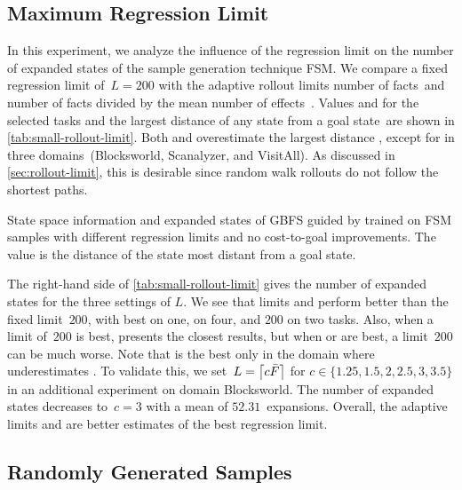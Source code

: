 \subsection{Maximum Regression Limit}
\label{sec:small-exps-rollout-limit}

In this experiment, we analyze the influence of the regression limit on the number of expanded states of the sample generation technique FSM. We compare a fixed regression limit of~$L=200$ with the adaptive rollout limits number of facts~\facts and number of facts divided by the mean number of effects~\meanfx. Values \facts and \meanfx for the selected tasks and the largest distance of any state from a goal state~\ssdiameter are shown in \cref{tab:small-rollout-limit}. Both \facts and \meanfx overestimate the largest distance \ssdiameter, except for \meanfx in three domains~(Blocksworld, Scanalyzer, and VisitAll). As discussed in \cref{sec:rollout-limit}, this is desirable since random walk rollouts do not follow the shortest paths.

\begin{table}[tb]
    \caption[State space information and expanded states with different regression limits.]{State space information and expanded states of GBFS guided by \hnn trained on FSM samples with different regression limits and no cost-to-goal improvements. The value \ssdiameter is the distance of the state most distant from a goal state.}
    \label{tab:small-rollout-limit}
    \addmargin
    \centering
    
\end{table}

The right-hand side of \cref{tab:small-rollout-limit} gives the number of expanded states for the three settings of $L$. We see that limits \facts and \meanfx perform better than the fixed limit~$200$, with \facts best on one, \meanfx on four, and $200$ on two tasks. Also, when a limit of~$200$ is best, \facts presents the closest results, but when \facts or \meanfx are best, a limit~$200$ can be much worse. Note that \facts is the best only in the domain where \meanfx underestimates \ssdiameter. To validate this, we set~$L=\left\lceil c\bar F\right\rceil$ for $c\in\{1.25,1.5,2,2.5,3,3.5\}$ in an additional experiment on domain Blocksworld. The number of expanded states decreases to~$c=3$ with a mean of $52.31$~expansions. Overall, the adaptive limits \facts and \meanfx are better estimates of the best regression limit.

\subsection{Randomly Generated Samples}
\label{sec:small-exps-random-samples}

